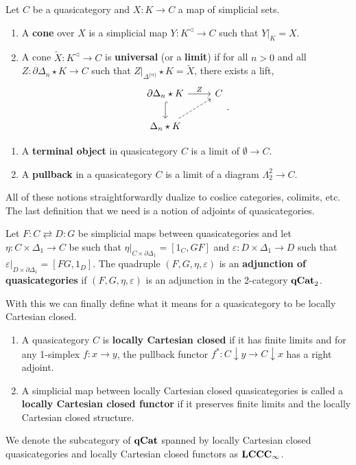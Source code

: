 \documentclass{amsart}
\begin{document}
\begin{defn}
    Let $C$ be a quasicategory and $X\colon K\to C$ a map of simplicial sets.
    \begin{enumerate}
        \item A \textbf{cone} over $X$ is a simplicial map $Y\colon K^\lhd\to C$ such that $Y\vert_K=X$.
        \item A cone $\tilde{X}\colon K^\lhd\to C$ is \textbf{universal} (or a \textbf{limit}) if for all $n>0$ and all $Z\colon\partial\Delta_n\star K\to C$ such that $Z|_{\Delta^{\{n\}}}\star K=\tilde{X}$, there exists a lift,
        \[\begin{tikzcd}
            \partial\Delta_n\star K \arrow[r, "Z"] \arrow[d, hook] & C\\
            \Delta_n\star K \arrow[ur, dashed]
        \end{tikzcd}.\]
    \end{enumerate}
\end{defn}

\begin{ex}
    \begin{enumerate}
        \item A \textbf{terminal object} in quasicategory $C$ is a limit of $\emptyset\to C$.
        \item A \textbf{pullback} in a quasicategory $C$ is a limit of a diagram $\Lambda_2^2\to C$.
    \end{enumerate}
\end{ex}

All of these notions straightforwardly dualize to coslice categories, colimits, etc. The last definition that we need is a notion of adjoints of quasicategories.
\begin{defn}
    Let $F\colon C\rightleftarrows D\colon\! G$ be simplicial maps between quasicategories and let $\eta\colon C\times\Delta_1\to C$ be such that $\eta|_{C\times\partial\Delta_1}=[1_C,GF]$ and $\varepsilon\colon D\times\Delta_1\to D$ such that $\varepsilon|_{D\times\partial\Delta_1}=[FG,1_D]$. The quadruple $(F,G,\eta,\varepsilon)$ is an \textbf{adjunction of quasicategories} if $(F,G,\eta,\varepsilon)$ is an adjunction in the 2-category $\operatorname{\mathbf{qCat}}_2$.
\end{defn}

With this we can finally define what it means for a quasicategory to be locally Cartesian closed.
\begin{defn}
    \begin{enumerate}
        \item A quasicategory $C$ is \textbf{locally Cartesian closed} if it has finite limits and for any 1-simplex $f\colon x\to y$, the pullback functor $f^*\colon C\downarrow y\to C\downarrow x$ has a right adjoint.
        \item A simplicial map between locally Cartesian closed quasicategories is called a \textbf{locally Cartesian closed functor} if it preserves finite limits and the locally Cartesian closed structure.
    \end{enumerate}
\end{defn}
We denote the subcategory of $\operatorname{\mathbf{qCat}}$ spanned by locally Cartesian closed quasicategories and locally Cartesian closed functors as $\operatorname{\mathbf{LCCC}}_\infty$.
\end{document}
